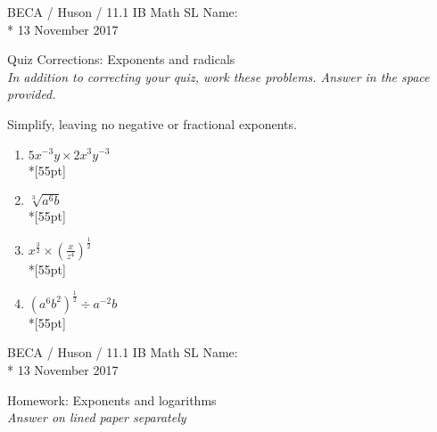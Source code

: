 \documentclass[]{book}
\begin{document}
\noindent BECA / Huson / 11.1 IB Math SL \hspace{2in} Name:\\*
13 November 2017
\begin{center}
{\Large Quiz Corrections: Exponents and radicals}\\
\textit{In addition to correcting your quiz, work these problems. Answer in the space provided.}
\end{center}



Simplify, leaving no negative or fractional exponents.

\begin{enumerate}

\item $5x^{-3}y \times 2x^3 y^{-3}$\\*[55pt]
\item $\sqrt[3]{a^6 b}$\\*[55pt]
\item $\displaystyle x^{\frac{3}{2}} \times (\frac{x}{z^4})^{\frac{1}{2}}$\\*[55pt]
\item $\displaystyle (a^6 b^2)^{\frac{1}{2}} \div a^{-2} b$\\*[55pt]

\end{enumerate}

\newpage
\noindent BECA / Huson / 11.1 IB Math SL \hspace{2in} Name:\\*
13 November 2017
\begin{center}
{\Large Homework: Exponents and logarithms}\\
\textit{Answer on lined paper separately}
\end{center}

\end{document}
